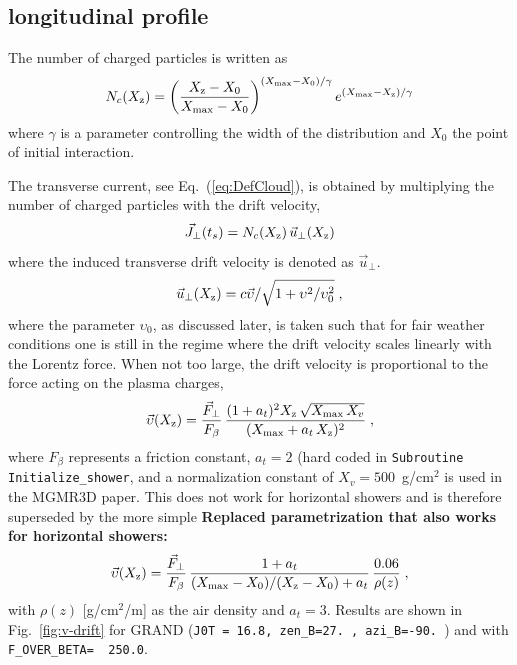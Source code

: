 \documentclass[pdftex,dvipsnames,usenames,fleqn,12pt]{article}
\def\beq{\begin{equation}}
\def\eeq{\end{equation} }
\def\figref#1{Fig.~\ref{fig:#1}}
\def\eqref#1{Eq.~(\ref{eq:#1})}
\def\eqlab#1{\label{eq:#1}}
\newcommand{\RED}{\color[named]{Red}}
\def\Xmax{X_{\rm max}}
\def\Xrh{X_{\rm z}}
\newcommand{\Added}[2]{{\marginpar{\RED \bf #1}\RED\bf #2}}
\begin{document}
\subsection{longitudinal profile}

The number of charged particles is written as
\beq
N_{c}(\Xrh)= \left({ \Xrh-X_0 \over \Xmax -X_0}\right)^{(\Xmax -X_0)/ \gamma} e^{(\Xmax - \Xrh)/\gamma}
\eqlab{Def-Nc}
\eeq
where $\gamma$ is a parameter controlling the width of the distribution and $X_0$ the point of initial interaction.

The transverse current, see \eqref{DefCloud}, is obtained by multiplying the number of charged particles with the drift velocity,
\beq
\vec{J}_\perp(t_s)= N_{c}(\Xrh) \,\vec{u}_\perp(\Xrh)
\eqlab{Def-It}
\eeq
where the induced transverse drift velocity is denoted as $\vec{u}_\perp$.
\beq
\vec{u}_\perp(\Xrh)=c \vec{\upsilon} /\sqrt{1 +\upsilon^2/\upsilon_0^2} \;,
\eqlab{Def-u}
\eeq
where the parameter $\upsilon_0$, as discussed later, is taken such that for fair weather conditions one is still in the regime where the drift velocity scales linearly with the Lorentz force. When not too large, the drift velocity is proportional to the force acting on the plasma charges,
\beq
\vec{\upsilon}(\Xrh)= {\vec{F}_\perp \over F_\beta}\, {(1+a_t)^2\Xrh\, \sqrt{\Xmax\,X_v}\over (\Xmax + a_t\,\Xrh)^2 } \;,
\eqlab{Def-sigma}
\eeq
where $F_\beta$ represents a friction constant, $a_t=2$ (hard coded in {\tt Subroutine Initialize\_shower}, and a normalization constant of $X_v=500$~g/cm$^2$ is used in the MGMR3D paper. This does not work for horizontal showers and is therefore superseded by the more simple
\Added{22/07/'18}{Replaced parametrization that also works for horizontal showers:}
\beq
\vec{\upsilon}(\Xrh)= {\vec{F}_\perp \over F_\beta}\, %
{1+a_t \over (\Xmax-X_0)/(\Xrh-X_0) + a_t}\,{0.06 \over \rho(z)} \;,
\eqlab{Def-sigma-1}
\eeq
with $\rho(z)$ [g/cm$^2$/m] as the air density and $a_t=3$. Results are shown in \figref{v-drift} for GRAND
(\verb<J0T = 16.8, zen_B=27. , azi_B=-90. <) and with \verb<F_OVER_BETA=  250.0<.
\end{document}
